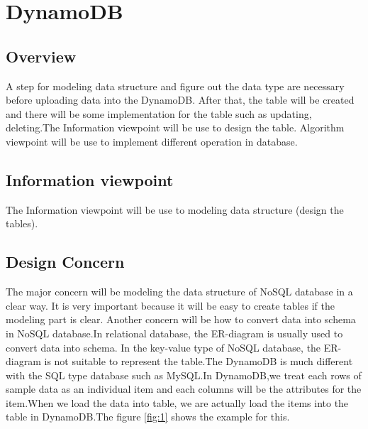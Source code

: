 \section{DynamoDB}
    \subsection{Overview}
    A step for modeling data structure and figure out the data type are necessary before uploading data into the DynamoDB. After that, the table will be created and there will be some implementation for the table such as updating, deleting.The Information viewpoint will be use to design the table. Algorithm viewpoint will be use to implement different operation in database.    
    \subsection{Information viewpoint}
    The Information viewpoint will be use to modeling data structure (design the tables).
	\subsection{ Design Concern}
	The major concern will be modeling the data structure of NoSQL database in a clear way. It is very important because it will be easy to create tables if the modeling part is clear. Another concern will be how to convert data into schema in NoSQL database.In relational database, the ER-diagram is usually used to convert data into schema. In the key-value type of NoSQL database, the ER-diagram is not suitable to represent the table.The DynamoDB is much different with the SQL type database such as MySQL.In DynamoDB,we treat each rows of sample data as an individual item and each columns will be the attributes for the item.When we load the data into table, we are actually load the items into the table in DynamoDB.The figure \ref{fig:1} shows the example for this.

